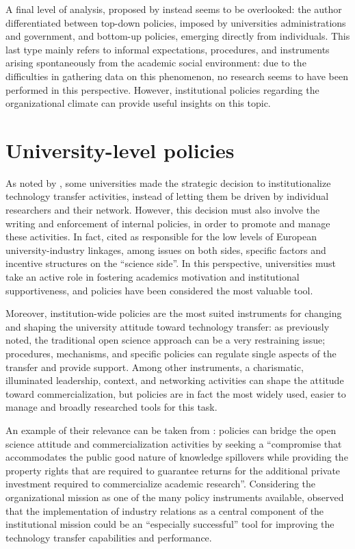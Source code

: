 A final level of analysis, proposed by \citet{Rasmussen2006} instead seems to be overlooked: the author differentiated between top-down policies, imposed by universities administrations and government, and bottom-up policies, emerging directly from individuals. This last type mainly refers to informal expectations, procedures, and instruments arising spontaneously from the academic social environment: due to the difficulties in gathering data on this phenomenon, no research seems to have been performed in this perspective. However, institutional policies regarding the organizational climate can provide useful insights on this topic.

\section{University-level policies}

As noted by \citet{Geuna2009}, some universities made the strategic decision to institutionalize technology transfer activities, instead of letting them be driven by individual researchers and their network. However, this decision must also involve the writing and enforcement of internal policies, in order to promote and manage these activities. In fact, \citet{Debackere2005} cited as responsible for the low levels of European university-industry linkages, among issues on both sides, specific factors and incentive structures on the \enquote{science side}. In this perspective, universities must take an active role in fostering academics motivation and institutional supportiveness, and policies have been considered the most valuable tool.

Moreover, institution-wide policies are the most suited instruments for changing and shaping the university attitude toward technology transfer: as previously noted, the traditional open science approach can be a very restraining issue; procedures, mechanisms, and specific policies can regulate single aspects of the transfer and  provide support. Among other instruments, a charismatic, illuminated leadership, context, and networking activities can shape the attitude toward commercialization, but policies are in fact the most widely used, easier to manage and broadly researched tools for this task. 

An example of their relevance can be taken from \citet{Bercovitz2006}: policies can bridge the open science attitude and commercialization activities by seeking a \enquote{compromise that accommodates the public good nature of knowledge spillovers while providing the property rights that are required to guarantee returns for the additional private investment required to commercialize academic research}.  Considering the organizational mission as one of the many policy instruments available, \citet{Debackere2005} observed that the implementation of industry relations as a central component of the institutional mission could be an \enquote{especially successful} tool for improving the technology transfer capabilities and performance. 

